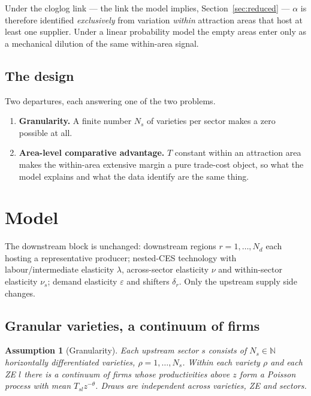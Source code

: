 \documentclass[11pt]{article}
\newtheorem{assumption}{Assumption}
\newcommand{\Nd}{N_{d}}
\begin{document}
Under the cloglog link --- the link the model implies, Section~\ref{sec:reduced} --- $\alpha$ is
therefore identified \emph{exclusively} from variation \emph{within} attraction areas that host at
least one supplier. Under a linear probability model the empty areas enter only as a mechanical
dilution of the same within-area signal.

\subsection{The design}

Two departures, each answering one of the two problems.

\begin{enumerate}[nosep,topsep=2pt,label=(\alph*)]
\item \textbf{Granularity.} A finite number $N_{s}$ of varieties per sector makes a zero possible
at all.
\item \textbf{Area-level comparative advantage.} $T$ constant within an attraction area makes the
within-area extensive margin a pure trade-cost object, so what the model explains and what the
data identify are the same thing.
\end{enumerate}

\section{Model}
\label{sec:model}

The downstream block is unchanged: downstream regions $r=1,\dots,\Nd$ each hosting a
representative producer; nested-CES technology with labour/intermediate elasticity $\lambda$,
across-sector elasticity $\nu$ and within-sector elasticity $\nu_{s}$; demand elasticity
$\varepsilon$ and shifters $\delta_{r}$. Only the upstream supply side changes.

\subsection{Granular varieties, a continuum of firms}

\begin{assumption}[Granularity]
\label{as:granular}
Each upstream sector $s$ consists of $N_{s}\in\mathbb{N}$ horizontally differentiated varieties,
$\rho=1,\dots,N_{s}$. Within each variety $\rho$ and each ZE $l$ there is a \emph{continuum} of
firms whose productivities above $z$ form a Poisson process with mean $T_{sl}z^{-\theta}$. Draws
are independent across varieties, ZE and sectors.
\end{assumption}
\end{document}
